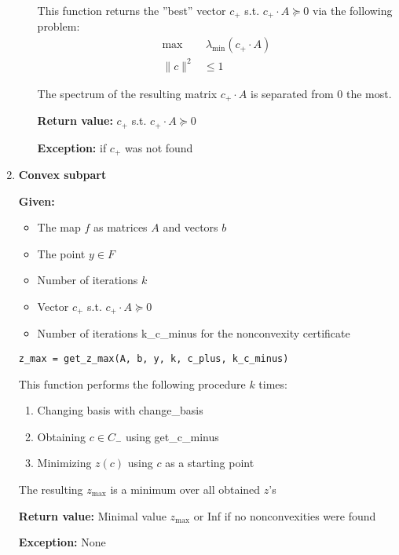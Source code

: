 \documentclass[a4paper]{article}
\theoremstyle{definition}
\begin{document}
\begin{enumerate}
\begin{enumerate}
	This function returns the ''best'' vector $c_+$ s.t. $c_+\cdot A\succeq 0$ via the following problem:
\begin{align}
\max & ~\lambda_{\min}(c_+\cdot A) \nonumber\\
\|c\|^2&  \leqslant 1 \nonumber
\end{align}
	
The spectrum of the resulting matrix $c_+\cdot A$ is separated from $0$ the most.
	
	{\bf Return value:} $c_+$ s.t. $c_+\cdot A\succeq 0$
	
	{\bf Exception:} if $c_+$ was not found
\end{enumerate}

\item {\bf Convex subpart}

{\bf Given:}
\begin{itemize}
	\item The map $f$ as matrices $A$ and vectors $b$
	\item The point $y\in F$
	\item Number of iterations $k$
	\item Vector $c_+$ s.t. $c_+\cdot A\succeq 0$
	\item Number of iterations k\_c\_minus for the nonconvexity certificate
\end{itemize}
\begin{verbatim}
z_max = get_z_max(A, b, y, k, c_plus, k_c_minus)
\end{verbatim}
This function performs the following procedure $k$ times:
\begin{enumerate}
\item Changing basis with change\_basis
\item Obtaining $c\in C_-$ using get\_c\_minus
\item Minimizing $z(c)$ using $c$ as a starting point
\end{enumerate}

The resulting $z_{\max}$ is a minimum over all obtained $z$'s

{\bf Return value:} Minimal value $z_{\max}$ or Inf if no nonconvexities were found

{\bf Exception:} None
\end{enumerate}
\end{document}
